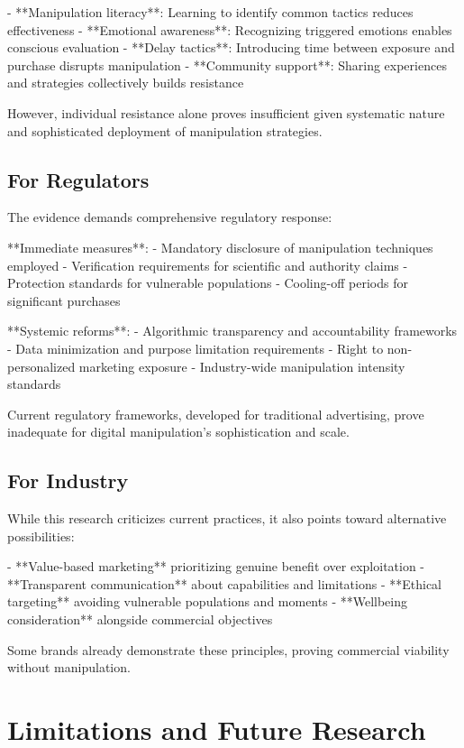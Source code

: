 - **Manipulation literacy**: Learning to identify common tactics reduces effectiveness
- **Emotional awareness**: Recognizing triggered emotions enables conscious evaluation
- **Delay tactics**: Introducing time between exposure and purchase disrupts manipulation
- **Community support**: Sharing experiences and strategies collectively builds resistance

However, individual resistance alone proves insufficient given systematic nature and sophisticated deployment of manipulation strategies.

\subsection{For Regulators}

The evidence demands comprehensive regulatory response:

**Immediate measures**:
- Mandatory disclosure of manipulation techniques employed
- Verification requirements for scientific and authority claims  
- Protection standards for vulnerable populations
- Cooling-off periods for significant purchases

**Systemic reforms**:
- Algorithmic transparency and accountability frameworks
- Data minimization and purpose limitation requirements
- Right to non-personalized marketing exposure
- Industry-wide manipulation intensity standards

Current regulatory frameworks, developed for traditional advertising, prove inadequate for digital manipulation's sophistication and scale.

\subsection{For Industry}

While this research criticizes current practices, it also points toward alternative possibilities:

- **Value-based marketing** prioritizing genuine benefit over exploitation
- **Transparent communication** about capabilities and limitations
- **Ethical targeting** avoiding vulnerable populations and moments
- **Wellbeing consideration** alongside commercial objectives

Some brands already demonstrate these principles, proving commercial viability without manipulation.

\section{Limitations and Future Research}
\label{sec:limitations_future_conclusion}


